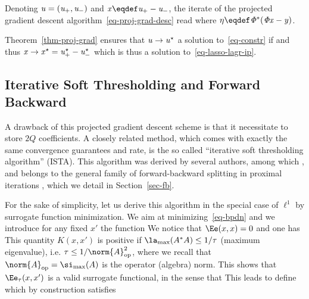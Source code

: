 Denoting $\it{u} = (\it{u_+},\it{u_-})$ and $\it{x} \eqdef \it{u_+}-\it{u_-}$, the iterate of the projected gradient descent algorithm~\eqref{eq-proj-grad-desc} read
where $\it{\eta} \eqdef \Phi^*( \Phi \it{x} - y )$.

Theorem~\ref{thm-proj-grad} ensures that $\it{u} \rightarrow u^\star$ a solution to~\eqref{eq-constr} if 
and thus $\it{x} \rightarrow x^\star = u_+^\star-u_-^\star$ which is thus a solution to~\eqref{eq-lasso-lagr-ip}. 


\subsection{Iterative Soft Thresholding and Forward Backward}
\label{sec-ista}

A drawback of this projected gradient descent scheme is that it necessitate to store $2Q$ coefficients. A closely related method, which comes with exactly the same convergence guarantees and rate, is the so called ``iterative soft thresholding algorithm'' (ISTA). 
%
This algorithm was derived by several authors, among which \cite{figueiredo-nowak-em,daubechies-iterated}, and belongs to the general family of forward-backward splitting in proximal iterations \cite{combettes-proximal}, which we detail in Section~\ref{sec-fb}.

For the sake of simplicity, let us derive this algorithm in the special case of $\ell^1$ by surrogate function minimization. 
%
We aim at minimizing~\eqref{eq-bpdn} 
and we introduce for any fixed $x'$ the function 
We notice that $\Ee(x,x)=0$ and one has 
This quantity $K(x,x')$ is positive if $\la_{\max}(A^*A) \leq 1/\tau$ (maximum eigenvalue), i.e. $\tau \leq 1/\norm{A}_{\text{op}}^2$, where we recall that $\norm{A}_{\text{op}} = \si_{\max}(A)$ is the operator (algebra) norm.
%
This shows that $\Ee_\tau(x,x')$ is a valid surrogate functional, in the sense that
This leads to define
which by construction satisfies 

